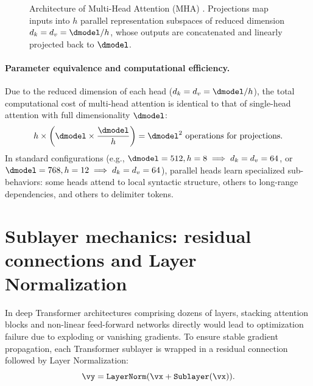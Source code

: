 \documentclass[../../main.tex]{subfiles}
\begin{document}
\begin{figure}[htbp]
\caption{Architecture of Multi-Head Attention (MHA) \cite{vaswani2017}. Projections map inputs into $h$ parallel representation subspaces of reduced dimension $d_k = d_v = \dmodel / h$, whose outputs are concatenated and linearly projected back to $\dmodel$.}
\label{fig:multi_head_attention_tikz}
\end{figure}

\paragraph{Parameter equivalence and computational efficiency.}
Due to the reduced dimension of each head ($d_k = d_v = \dmodel / h$), the total computational cost of multi-head attention is identical to that of single-head attention with full dimensionality $\dmodel$:
\begin{equation}
h \times \left( \dmodel \times \frac{\dmodel}{h} \right) = \dmodel^2 \text{ operations for projections}.
\end{equation}
In standard configurations (e.g., $\dmodel = 512, h = 8 \implies d_k = d_v = 64$, or $\dmodel = 768, h = 12 \implies d_k = d_v = 64$), parallel heads learn specialized sub-behaviors: some heads attend to local syntactic structure, others to long-range dependencies, and others to delimiter tokens.

\section{Sublayer mechanics: residual connections and Layer Normalization}
\label{sec:sublayer_mechanics}

In deep Transformer architectures comprising dozens of layers, stacking attention blocks and non-linear feed-forward networks directly would lead to optimization failure due to exploding or vanishing gradients. To ensure stable gradient propagation, each Transformer sublayer is wrapped in a residual connection followed by Layer Normalization:
\begin{equation}
\label{eq:add_and_norm_post}
\vy = \text{\texttt{LayerNorm}}(\vx + \text{\texttt{Sublayer}}(\vx)).
\end{equation}
\end{document}

